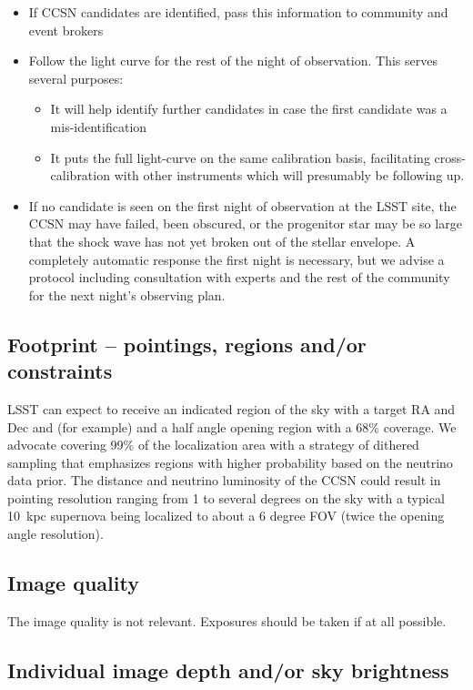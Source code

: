 \documentclass[12pt, letterpaper]{article}
\begin{document}
\begin{itemize}
\item If CCSN candidates are identified, pass this information to
  community and event brokers
\item Follow the light curve for the rest of the night of
  observation. This serves several purposes:
  \begin{itemize}
  \item It will help identify further candidates in case the first
    candidate was a mis-identification
  \item It puts the full light-curve on the same calibration basis,
    facilitating cross-calibration with other instruments which will
    presumably be following up.
  \end{itemize}
\item If no candidate is seen on the first night of observation at the
  LSST site, the CCSN may have failed, been obscured, or the
  progenitor star may be so large that the shock wave has not yet
  broken out of the stellar envelope.  A completely automatic response
  the first night is necessary, but we advise a protocol including
  consultation with experts and the rest of the community for the next
  night's observing plan.
\end{itemize}

\subsection{Footprint -- pointings, regions and/or constraints}

LSST can expect to receive an indicated region of the sky with a
target RA and Dec and (for example) and a half angle opening region
with a 68\% coverage.  We advocate covering 99\% of the localization
area with a strategy of dithered sampling that emphasizes regions with
higher probability based on the neutrino data prior.  The distance and
neutrino luminosity of the CCSN could result in pointing resolution
ranging from 1 to several degrees on the sky with a typical 10~kpc
supernova being localized to about a 6 degree FOV (twice the opening
angle resolution).

\subsection{Image quality}

The image quality is not relevant.  Exposures should be taken if at all possible.

\subsection{Individual image depth and/or sky brightness}
\end{document}
